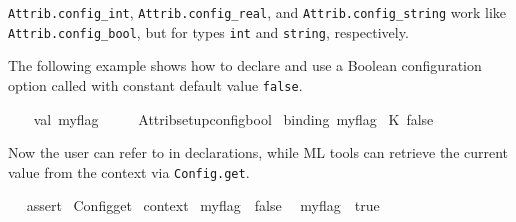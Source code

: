 \begin{isabellebody}
\begin{isamarkuptext}
\begin{description}
  \item \verb|Attrib.config_int|, \verb|Attrib.config_real|, and \verb|Attrib.config_string| work like \verb|Attrib.config_bool|, but for
  types \verb|int| and \verb|string|, respectively.

  \end{description}%
\end{isamarkuptext}%
\isamarkuptrue%
%
\endisatagmlref
{\isafoldmlref}%
%
\isadelimmlref
%
\endisadelimmlref
%
\isadelimmlex
%
\endisadelimmlex
%
\isatagmlex
%
\begin{isamarkuptext}%
The following example shows how to declare and use a
  Boolean configuration option called  with constant
  default value \verb|false|.%
\end{isamarkuptext}%
\isamarkuptrue%
%
\endisatagmlex
{\isafoldmlex}%
%
\isadelimmlex
%
\endisadelimmlex
%
\isadelimML
%
\endisadelimML
%
\isatagML
{}\isamarkupfalse%
\ {}\isanewline
\ \ val\ my{}flag\ {}\isanewline
\ \ \ \ Attrib{}setup{}config{}bool\ %
\isaantiq
binding\ my{}flag{}%
\endisaantiq
\ {}K\ false{}\isanewline
{}%
\endisatagML
{\isafoldML}%
%
\isadelimML
%
\endisadelimML
%
\begin{isamarkuptext}%
Now the user can refer to \hyperlink{attribute.my-flag}{\mbox{}} in
  declarations, while ML tools can retrieve the current value from the
  context via \verb|Config.get|.%
\end{isamarkuptext}%
\isamarkuptrue%
%
\isadelimML
%
\endisadelimML
%
\isatagML
{}\isamarkupfalse%
\ {}\ %
\isaantiq
assert{}%
\endisaantiq
\ {}Config{}get\ %
\isaantiq
context{}%
\endisaantiq
\ my{}flag\ {}\ false{}\ {}%
\endisatagML
{\isafoldML}%
%
\isadelimML
%
\endisadelimML
\isanewline
\isanewline
{}\isamarkupfalse%
\ {}{}my{}flag\ {}\ true{}{}\isanewline

\end{isabellebody}
